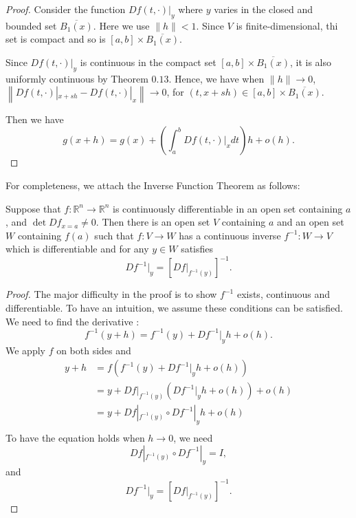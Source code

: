 \documentclass[10pt]{article}
\newcommand{\R}{\mathbb{R}}
\begin{document}
\begin{proof}
    Consider the function $Df(t, \cdot)|_{y}$ where $y$ varies in the closed and bounded set $\overline{B_{1}(x)}$.
    Here we use $\|h\| < 1$. Since $V$ is finite-dimensional, thi set is compact and so is $[a,b] \times \overline{B_{1}(x)}$.

    Since $Df(t, \cdot)|_{y}$ is continuous in the compact set $[a,b] \times \overline{B_{1}(x)}$, it is also
    uniformly continuous by Theorem $0.13$. Hence, we have when $\|h\| \to 0$, 
    $\left\|Df(t, \cdot)|_{x+sh} - Df(t,\cdot)|_{x}\right\| \to 0$, for $(t,x+sh) \in [a,b] \times \overline{B_{1}(x)}$.

    Then we have
    \[
      g(x+h) = g(x) + \left(\int_{a}^{b}Df(t,\cdot)|_{x}dt\right)h + o(h).
    \]
  \end{proof}

  For completeness, we attach the Inverse Function Theorem as follows:
  \begin{theorem}
    Suppose that $f : \R^{n} \to \R^{n}$ is continuously differentiable in an open set containing $a$, and $\det Df_{x = a} \neq 0$.
    Then there is an open set $V$ containing $a$ and an open set $W$ containing $f(a)$ such that $f : V \to W$ has a continuous inverse $f^{-1} : W \to V$ which is differentiable and for any $y \in W$ satisfies
    \[
      Df^{-1}|_{y} = \left[Df|_{f^{-1}(y)}\right]^{-1}.  
    \]
  \end{theorem}
  \begin{proof}
    The major difficulty in the proof is to show $f^{-1}$ exists, continuous and differentiable.
    To have an intuition, we assume these conditions can be satisfied.
    We need to find the derivative :
    \[
      f^{-1}(y+h) = f^{-1}(y) + Df^{-1}|_{y}h + o(h).  
    \]
    We apply $f$ on both sides and
    \[
      \begin{aligned}
        y + h &= f(f^{-1}(y) + Df^{-1}|_{y}h + o(h))  \\
        &= y + Df|_{f^{-1}(y)} (Df^{-1}|_{y}h + o(h)) + o(h) \\
        &= y + Df|_{f^{-1}(y)} \circ Df^{-1}|_{y}h + o(h)\\
      \end{aligned}
    \]
    To have the equation holds when $h \to 0$, we need
    \[
      Df|_{f^{-1}(y)} \circ Df^{-1}|_{y} = I,  
    \]
    and
    \[
      Df^{-1}|_{y} = \left[Df|_{f^{-1}(y)}\right]^{-1}.
    \]
  \end{proof}
  \newpage
\end{document}

